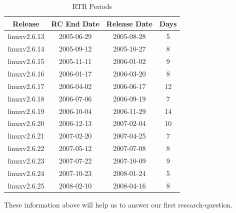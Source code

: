 \documentclass{acm_proc_article-sp}
\begin{document}
\begin{table}[ht]
\caption{RTR Periods}  %
\centering 						%
\begin{tabular}{c c c c}				%
\hline\hline						%
Release 			& RC End Date	& Release Date	& Days \\ [0.5ex]
\hline 							%
linuxv2.6.13		& 2005-06-29	& 2005-08-28	& 5 \\
linuxv2.6.14		& 2005-09-12	& 2005-10-27	& 8 \\
linuxv2.6.15		& 2005-11-11	& 2006-01-02	& 9 \\
linuxv2.6.16		& 2006-01-17	& 2006-03-20	& 8 \\
linuxv2.6.17		& 2006-04-02	& 2006-06-17	& 12 \\
linuxv2.6.18		& 2006-07-06	& 2006-09-19	& 7 \\
linuxv2.6.19		& 2006-10-04	& 2006-11-29	& 14 \\
linuxv2.6.20  		& 2006-12-13	& 2007-02-04	& 10 \\
linuxv2.6.21		& 2007-02-20	& 2007-04-25	& 7 \\
linuxv2.6.22		& 2007-05-12	& 2007-07-08	& 8 \\
linuxv2.6.23		& 2007-07-22	& 2007-10-09	& 9 \\
linuxv2.6.24		& 2007-10-23	& 2008-01-24	& 5 \\
linuxv2.6.25		& 2008-02-10	& 2008-04-16	& 8 \\
[1ex]							%
\hline 							%
\end{tabular}
\label{table:nonlin} 				%
\end{table}

These information above will help us to answer our first research-question.
\end{document}

